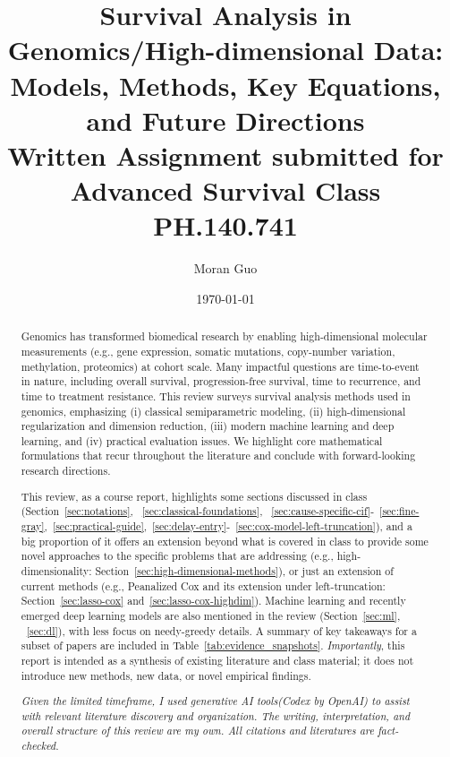 \documentclass[11pt]{article}
\title{Survival Analysis in Genomics/High-dimensional Data: Models, Methods, Key Equations, and Future Directions \\ \vspace{1em} \large{Written Assignment submitted for Advanced Survival Class PH.140.741}}
\author{Moran Guo}
\date{\today}
\begin{document}
\maketitle

\begin{abstract}
Genomics has transformed biomedical research by enabling high-dimensional molecular measurements (e.g., gene expression, somatic mutations, copy-number variation, methylation, proteomics) at cohort scale. Many impactful questions are time-to-event in nature, including overall survival, progression-free survival, time to recurrence, and time to treatment resistance. This review surveys survival analysis methods used in genomics, emphasizing (i) classical semiparametric modeling, (ii) high-dimensional regularization and dimension reduction, (iii) modern machine learning and deep learning, and (iv) practical evaluation issues. We highlight core mathematical formulations that recur throughout the literature and conclude with forward-looking research directions.

This review, as a course report, highlights some sections discussed in class (Section~\ref{sec:notations}, ~\ref{sec:classical-foundations}, ~\ref{sec:cause-specific-cif}-~\ref{sec:fine-gray},~\ref{sec:practical-guide},~\ref{sec:delay-entry}-~\ref{sec:cox-model-left-truncation}), and a big proportion of it offers an extension beyond what is covered in class to provide some novel approaches to the specific problems that are addressing (e.g., high-dimensionality: Section~\ref{sec:high-dimensional-methods}), or just an extension of current methods (e.g., Peanalized Cox and its extension under left-truncation: Section~\ref{sec:lasso-cox} and~\ref{sec:lasso-cox-highdim}). Machine learning and recently emerged deep learning models are also mentioned in the review (Section~\ref{sec:ml}, ~\ref{sec:dl}), with less focus on needy-greedy details. A summary of key takeaways for a subset of papers are included in Table~\ref{tab:evidence_snapshots}. \textit{Importantly}, this report is intended as a synthesis of existing literature and class material; it does not introduce new methods, new data, or novel empirical findings.

\textit{Given the limited timeframe, I used generative AI tools(Codex by OpenAI) to assist with relevant literature discovery and organization. The writing, interpretation, and overall structure of this review are my own. All citations and literatures are fact-checked.}

\end{abstract}
\end{document}
